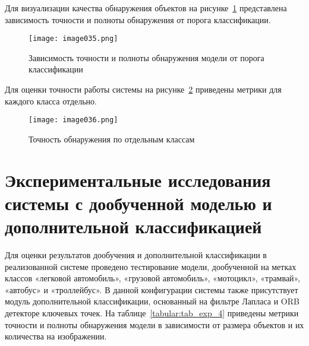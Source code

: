 Для визуализации качества обнаружения объектов на рисунке~\ref{fig:image035} представлена зависимость точности и полноты обнаружения от порога классификации.

\begin{figure}[htbp]
\centering
\texttt{[image: image035.png]}
\caption{Зависимость точности и полноты обнаружения модели от порога классификации}%
\label{fig:image035}
\end{figure}

Для оценки точности работы системы на рисунке~\ref{fig:image036} приведены метрики для каждого класса отдельно.

\begin{figure}[htbp]
\centering
\texttt{[image: image036.png]}
\caption{Точность обнаружения по отдельным классам}%
\label{fig:image036}
\end{figure}

\section{Экспериментальные исследования системы с дообученной моделью и дополнительной классификацией}

Для оценки результатов дообучения и дополнительной классификации в реализованной системе проведено тестирование модели, дообученной на метках классов «легковой автомобиль», «грузовой автомобиль», «мотоцикл», «трамвай», «автобус» и «троллейбус». В данной конфигурации системы также присутствует модуль дополнительной классификации, основанный на фильтре Лапласа и ORB детекторе ключевых точек. На таблице~\ref{tabular:tab_exp_4} приведены метрики точности и полноты обнаружения модели в зависимости от размера объектов и их количества на изображении.

